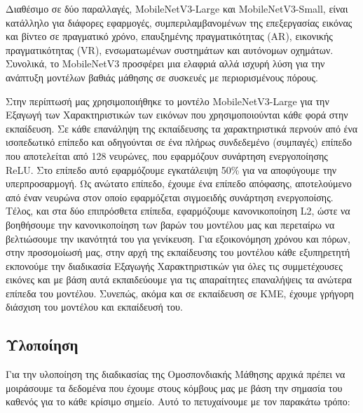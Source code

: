 Διαθέσιμο σε δύο παραλλαγές, MobileNetV3-Large και MobileNetV3-Small, είναι κατάλληλο για διάφορες εφαρμογές, συμπεριλαμβανομένων της επεξεργασίας εικόνας και βίντεο σε πραγματικό χρόνο, επαυξημένης πραγματικότητας (AR), εικονικής πραγματικότητας (VR), ενσωματωμένων συστημάτων και αυτόνομων οχημάτων. Συνολικά, το MobileNetV3 προσφέρει μια ελαφριά αλλά ισχυρή λύση για την ανάπτυξη μοντέλων βαθιάς μάθησης σε συσκευές με περιορισμένους πόρους.

Στην περίπτωσή μας χρησιμοποιήθηκε το μοντέλο MobileNetV3-Large για την Εξαγωγή των Χαρακτηριστικών των εικόνων που χρησιμοποιούνται κάθε φορά στην εκπαίδευση. Σε κάθε επανάληψη της εκπαίδευσης τα χαρακτηριστικά περνούν από ένα ισοπεδωτικό επίπεδο και οδηγούνται σε ένα πλήρως συνδεδεμένο (συμπαγές) επίπεδο που αποτελείται από 128 νευρώνες, που εφαρμόζουν συνάρτηση ενεργοποίησης ReLU. Στο επίπεδο αυτό εφαρμόζουμε εγκατάλειψη 50\% για να αποφύγουμε την υπερπροσαρμογή. Ως ανώτατο επίπεδο, έχουμε ένα επίπεδο απόφασης, αποτελούμενο από έναν νευρώνα στον οποίο εφαρμόζεται σιγμοειδής συνάρτηση ενεργοποίσης. Τέλος, και στα δύο επιπρόσθετα επίπεδα, εφαρμόζουμε κανονικοποίηση L2, ώστε να βοηθήσουμε την κανονικοποίηση των βαρών του μοντέλου μας και περεταίρω να βελτιώσουμε την ικανότητά του για γενίκευση. Για εξοικονόμηση χρόνου και πόρων, στην προσομοίωσή μας, στην αρχή της εκπαίδευσης του μοντέλου κάθε εξυπηρετητή εκπονούμε την διαδικασία Εξαγωγής Χαρακτηριστικών για όλες τις συμμετέχουσες εικόνες και με βάση αυτά εκπαιδεύουμε για τις απαραίτητες επαναλήψεις τα ανώτερα επίπεδα του μοντέλου. Συνεπώς, ακόμα και σε εκπαίδευση σε ΚΜΕ, έχουμε γρήγορη διάσχιση του μοντέλου και εκπαίδευσή του.

\subsection{Υλοποίηση}

\vspace{-3pt}

Για την υλοποίηση της διαδικασίας της Ομοσπονδιακής Μάθησης αρχικά πρέπει να μοιράσουμε τα δεδομένα που έχουμε στους κόμβους μας με βάση την σημασία του καθενός για το κάθε κρίσιμο σημείο. Αυτό το πετυχαίνουμε με τον παρακάτω τρόπο:

\newpage

